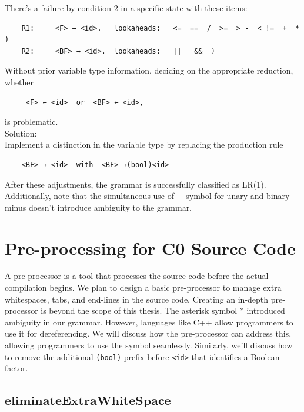 \begin{enumerate}
    There’s a failure by condition 2 in a specific state with these items:
    \begin{verbatim}
    R1:		<F> → <id>.   lookaheads:   <=  ==  /  >=  > -  < !=  +  *  )
    R2:		<BF> → <id>.  lookaheads:   ||   &&  )
    \end{verbatim}
    Without prior variable type information, deciding on the appropriate reduction, whether
    \begin{verbatim}
     <F> ← <id>  or  <BF> ← <id>,
    \end{verbatim}
    is problematic.\\

    Solution: \\
    Implement a distinction in the variable type by replacing the production rule
    \begin{verbatim}
    <BF> → <id>  with  <BF> →(bool)<id>
    \end{verbatim}

    After these adjustments, the grammar is successfully classified as LR(1). Additionally, note that the simultaneous use of \(-\) symbol for unary and binary minus doesn’t introduce ambiguity to the grammar.
\end{enumerate}


\newpage


\section{Pre-processing for C0 Source Code}\label{sec:Pre-processing for C0 Source Code}

A pre-processor is a tool that processes the source code before the actual compilation begins. We plan to design a basic pre-processor to manage extra whitespaces, tabs, and end-lines in the source code. Creating an in-depth pre-processor is beyond the scope of this thesis. The asterisk symbol \(\ast\) introduced ambiguity in our grammar. However, languages like C++ allow programmers to use it for dereferencing. We will discuss how the pre-processor can address this, allowing programmers to use the symbol seamlessly. Similarly, we'll discuss how to remove the additional \texttt{(bool)} prefix before \texttt{<id>} that identifies a Boolean factor.

\vspace{10pt}

\subsection{\(\boldsymbol{eliminateExtraWhiteSpace}\)}

